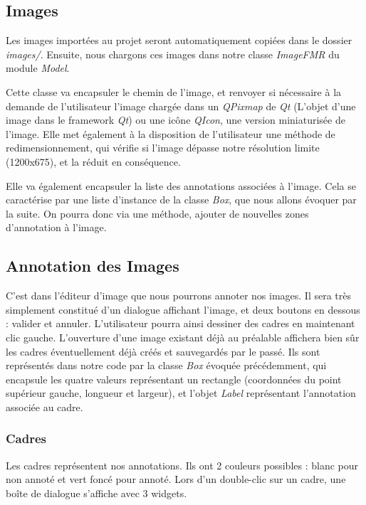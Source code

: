 \documentclass{rapport}
\begin{document}
        \subsection{Images}
        Les images importées au projet seront automatiquement copiées dans le dossier \textit{images/}. Ensuite, nous chargons ces images dans notre classe \textit{ImageFMR} du module \textit{Model}.


        Cette classe va encapsuler le chemin de l'image, et renvoyer si nécessaire à la demande de l'utilisateur l'image chargée dans un \textit{QPixmap} de \textit{Qt} (L'objet d'une image dans le framework \textit{Qt}) ou une icône \textit{QIcon}, une version miniaturisée de l'image. Elle met également à la disposition de l'utilisateur une méthode de redimensionnement, qui vérifie si l'image dépasse notre résolution limite (1200x675), et la réduit en conséquence.


        Elle va également encapsuler la liste des annotations associées à l'image. Cela se caractérise par une liste d'instance de la classe \textit{Box}, que nous allons évoquer par la suite. On pourra donc via une méthode, ajouter de nouvelles zones d'annotation à l'image.
        
        \subsection{Annotation des Images}
        C'est dans l'éditeur d'image que nous pourrons annoter nos images. Il sera très simplement constitué d'un dialogue affichant l'image, et deux boutons en dessous : valider et annuler. L'utilisateur pourra ainsi dessiner des cadres en maintenant clic gauche. L'ouverture d'une image existant déjà au préalable affichera bien sûr les cadres éventuellement déjà créés et sauvegardés par le passé. Ils sont représentés dans notre code par la classe \textit{Box} évoquée précédemment, qui encapsule les quatre valeurs représentant un rectangle (coordonnées du point supérieur gauche, longueur et largeur), et l'objet \textit{Label} représentant l'annotation associée au cadre.

            \subsubsection{Cadres}
            Les cadres représentent nos annotations. Ils ont 2 couleurs possibles : blanc pour non annoté et vert foncé pour annoté. Lors d'un double-clic sur un cadre, une boîte de dialogue s'affiche avec 3 widgets.
\end{document}
